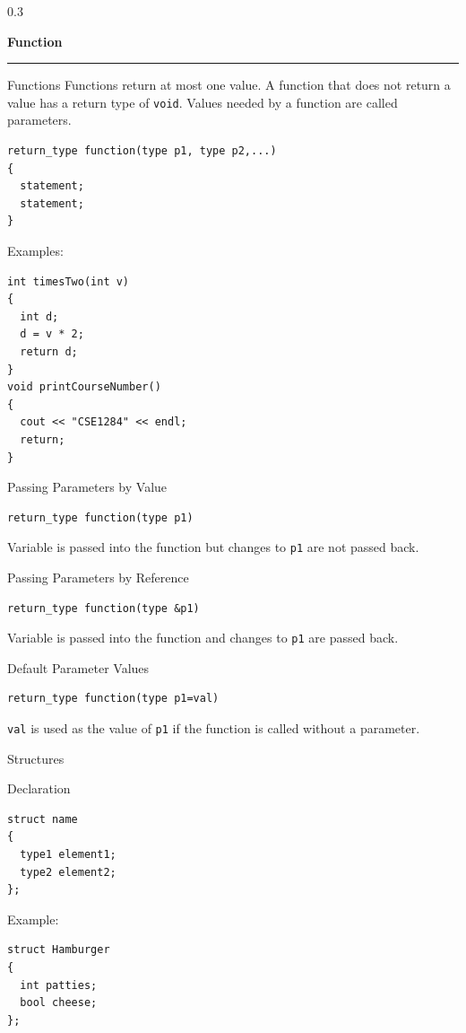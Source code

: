 \documentclass[final]{beamer}
\renewcommand{\section}[1]{%
  \par\vspace{1em}%
  {\noindent\usebeamerfont{section title}\Large\bfseries #1\par}%
  \vspace{0.5em}\hrule\vspace{1em}%
}
\begin{document}
\begin{frame}[t,fragile]
\begin{columns}[t,totalwidth=0.95\paperwidth, colsep=0.05\paperwidth]
\begin{column}{0.3\paperwidth}
\section{Function}
\begin{block}{Functions}
Functions return at most one value. A function that does not return a value has a return type of \texttt{void}. Values needed by a function are called parameters.
\begin{lstlisting}
return_type function(type p1, type p2,...)
{
  statement;
  statement;
}
\end{lstlisting}
Examples:
\begin{lstlisting}
int timesTwo(int v)
{
  int d;
  d = v * 2;
  return d;
}
void printCourseNumber()
{
  cout << "CSE1284" << endl;
  return;
}
\end{lstlisting}
\end{block}

\begin{block}{Passing Parameters by Value}
\begin{lstlisting}
return_type function(type p1)
\end{lstlisting}
Variable is passed into the function but changes to \texttt{p1} are not passed back.
\end{block}

\begin{block}{Passing Parameters by Reference}
\begin{lstlisting}
return_type function(type &p1)
\end{lstlisting}
Variable is passed into the function and changes to \texttt{p1} are passed back.
\end{block}

\begin{block}{Default Parameter Values}
\begin{lstlisting}
return_type function(type p1=val)
\end{lstlisting}
\texttt{val} is used as the value of \texttt{p1} if the function is called without a parameter.
\end{block}

\begin{block}{Structures}
\end{block}

\begin{block}{Declaration}
\begin{lstlisting}
struct name
{
  type1 element1;
  type2 element2;
};
\end{lstlisting}
Example:
\begin{lstlisting}
struct Hamburger
{
  int patties;
  bool cheese;
};
\end{lstlisting}
\end{block}


\end{column}
\end{columns}
\end{frame}
\end{document}
